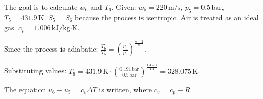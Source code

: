 The goal is to calculate \( w_6 \) and \( T_6 \).  
Given:  
\( w_5 = 220 \, \text{m/s} \), \( p_5 = 0.5 \, \text{bar} \), \( T_5 = 431.9 \, \text{K} \).  
\( S_5 = S_6 \) because the process is isentropic.  
Air is treated as an ideal gas.  
\( c_p = 1.006 \, \text{kJ/kg·K} \).  

Since the process is adiabatic:  
\( \frac{T_6}{T_5} = \left( \frac{p_6}{p_5} \right)^{\frac{n-1}{n}} \).  

Substituting values:  
\( T_6 = 431.9 \, \text{K} \cdot \left( \frac{0.191 \, \text{bar}}{0.5 \, \text{bar}} \right)^{\frac{1.4-1}{1.4}} = 328.075 \, \text{K} \).  

The equation \( u_6 - u_5 = c_v \Delta T \) is written, where \( c_v = c_p - R \).
